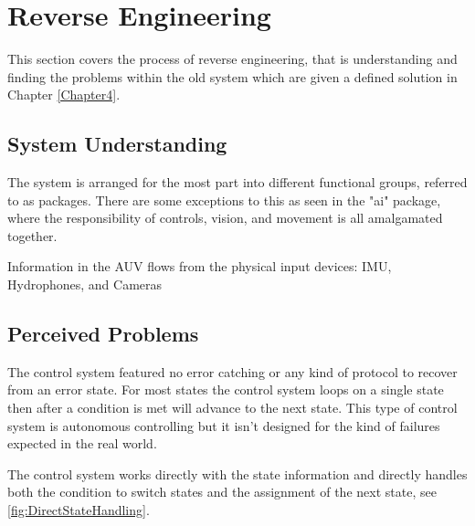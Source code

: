 
\chapter{Reverse Engineering} %

\label{Chapter3} %

This section covers the process of reverse engineering, that is understanding and finding the problems within the old system which are given a defined solution in Chapter \ref{Chapter4}.


\section{System Understanding}

The system is arranged for the most part into different functional groups, referred to as packages. There are some exceptions to this as seen in the "ai" package, where the responsibility of controls, vision, and movement is all amalgamated together.

Information in the AUV flows from the physical input devices: IMU, Hydrophones, and Cameras



\section{Perceived Problems}

The control system featured no error catching or any kind of protocol to recover from an error state.
For most states the control system loops on a single state then after a condition is met will advance to the next state. This type of control system is autonomous controlling but it isn't designed for the kind of failures expected in the real world.

The control system works directly with the state information and directly handles both the condition to switch states and the assignment of the next state, see \ref{fig:DirectStateHandling}.

